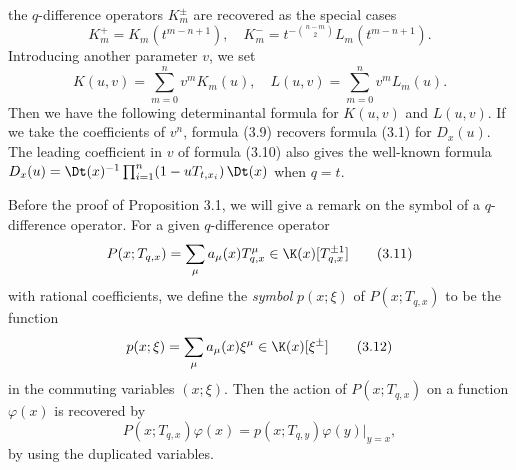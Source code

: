 the $q$-difference operators $K^\pm_m$ are recovered as the special cases
$$
K^+_m=K_m(t^{m-n+1}),\quad K^-_m=t^{-\binom{n-m}{2}} L_m(t^{m-n+1}). 
\tag{3.7}
$$ 
Introducing another parameter $v$, we set 
$$
K(u,v)=\sum_{m=0}^n v^m K_m(u),\quad L(u,v)=\sum_{m=0}^n v^m L_m(u). 
\tag{3.8}
$$
Then we have the following determinantal formula for $K(u,v)$ and $L(u,v)$. 
%
\noindent
If we take the coefficients of $v^n$, formula (3.9) recovers formula 
(3.1) for $D_x(u)$.  
The leading coefficient in $v$ of formula (3.10) also gives the well-known 
formula $D_x(u)=\Dt(x)^{-1}\prod_{i=1}^n(1-uT_{t,x_i})\,\Dt(x)$ 
when $q=t$. 
\par
Before the proof of Proposition 3.1, we will give a remark on 
the symbol of a $q$-difference operator. 
For a given $q$-difference operator 
$$
P(x;T_{q,x})=\sum_{\mu} a_{\mu}(x) T_{q,x}^\mu\in\K(x)[T_{q,x}^{\pm1}]
\tag{3.11}
$$
with rational coefficients, 
we define the {\it symbol} $p(x;\xi)$ of $P(x;T_{q,x})$ to be the function 
$$
p(x;\xi)=\sum_{\mu} a_{\mu}(x) \xi^\mu\in \K(x)[\xi^{\pm}]
\tag{3.12}
$$
in the commuting variables $(x;\xi)$. 
Then the action of $P(x;T_{q,x})$ on a function $\varphi(x)$ is 
recovered by 
$$
P(x;T_{q,x})\varphi(x)=p(x;T_{q,y})\varphi(y)|_{y=x},
\tag{3.13}
$$
by using the duplicated variables.
%
